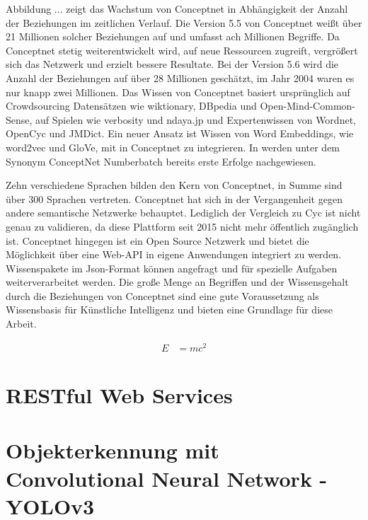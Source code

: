 Abbildung ... zeigt das Wachstum von Conceptnet in Abhängigkeit der Anzahl der Beziehungen im zeitlichen Verlauf. Die Version 5.5 von Conceptnet weißt über 21 Millionen solcher Beziehungen auf und umfasst ach Millionen Begriffe. Da Conceptnet stetig weiterentwickelt wird, auf neue Ressourcen zugreift, vergrößert sich das Netzwerk und erzielt bessere Resultate. Bei der Version 5.6 wird die Anzahl der Beziehungen auf über 28 Millionen geschätzt, im Jahr 2004 waren es nur knapp zwei Millionen. 
Das Wissen von Conceptnet basiert ursprünglich auf Crowdsourcing Datensätzen wie wiktionary, DBpedia und Open-Mind-Common-Sense, auf Spielen wie verbosity und ndaya.jp und Expertenwissen von Wordnet, OpenCyc und JMDict. Ein neuer Ansatz ist Wissen von Word Embeddings, wie word2vec und GloVe, mit in Conceptnet zu integrieren. In \cite{speer2017conceptnet} werden unter dem Synonym ConceptNet Numberbatch bereits erste Erfolge nachgewiesen.

Zehn verschiedene Sprachen bilden den Kern von Conceptnet, in Summe sind über 300 Sprachen vertreten. Conceptnet hat sich in der Vergangenheit gegen andere semantische Netzwerke behauptet. Lediglich der Vergleich zu Cyc ist nicht genau zu validieren, da diese Plattform seit 2015 nicht mehr öffentlich zugänglich ist. Conceptnet hingegen ist ein Open Source Netzwerk und bietet die Möglichkeit über eine Web-API in eigene Anwendungen integriert zu werden. Wissenspakete im Json-Format können angefragt und für spezielle Aufgaben weiterverarbeitet werden. 
Die große Menge an Begriffen und der Wissensgehalt durch die Beziehungen von Conceptnet sind eine gute Voraussetzung als Wissensbasis für Künstliche Intelligenz und bieten eine Grundlage für diese Arbeit. 
\cite{liu2004conceptnet}
\cite{havasi2007conceptnet}
\cite{speer2013conceptnet}
\cite{speer2017conceptnet} 

\begin{align}
E &= mc^2
\end{align}






\section{RESTful Web Services}
\label{sec:cn}



\section{Objekterkennung mit Convolutional Neural Network - YOLOv3}
\label{sec:cn}

